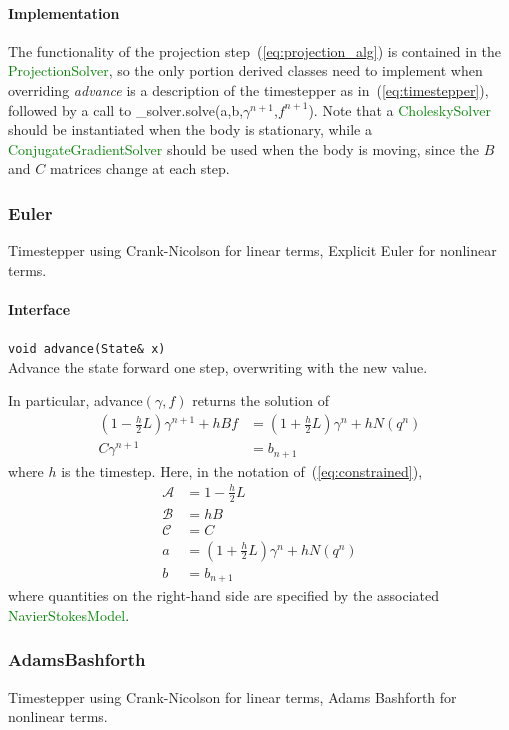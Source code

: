\documentclass[11pt]{article}
\def\class#1{\textcolor{green}{\ttfamily\small #1}} %
\def\fn#1{{\ttfamily\small #1}} %
\def\virtualfn#1{{\ttfamily\small\slshape #1}} %
\let\code\lstinline
\begin{document}
\paragraph{Implementation}
The functionality of the projection step~(\ref{eq:projection_alg}) is contained in the \class{ProjectionSolver}, so the only portion derived classes need to implement when overriding \virtualfn{advance} is a description of the timestepper as in~(\ref{eq:timestepper}), followed by a call to \fn{\_solver.solve}(a,b,$\gamma^{n+1}$,$f^{n+1}$).  Note that a \class{CholeskySolver} should be instantiated when the body is stationary, while a \class{ConjugateGradientSolver} should be used when the body is moving, since the $B$ and $C$ matrices change at each step.

\subsubsection{Euler}
Timestepper using Crank-Nicolson for linear terms, Explicit Euler for nonlinear terms.

\paragraph{Interface}
\begin{description}
	\item \code|void advance(State& x)|\\
		Advance the state forward one step, overwriting with the new value.  
\end{description}

In particular, \fn{advance}$(\gamma,f)$ returns the solution of
	\begin{align}
		(1-\frac{h}{2}L)\gamma^{n+1} + hBf &= (1 + \frac{h}{2}L)\gamma^n + h N(q^n)\\
		C\gamma^{n+1} &= b_{n+1}
	\end{align}
where $h$ is the timestep.  Here, in the notation of~(\ref{eq:constrained}),
\begin{align}
	\mathcal{A} &= 1-\frac{h}{2} L\\
	\mathcal{B} &= hB\\
	\mathcal{C} &= C\\
	a &= (1+\frac{h}{2}L)\gamma^n + hN(q^n)\\
	b &= b_{n+1}
\end{align}
where quantities on the right-hand side are specified by the associated \class{NavierStokesModel}.

\subsubsection{AdamsBashforth}
Timestepper using Crank-Nicolson for linear terms, Adams Bashforth for nonlinear terms.
\end{document}

